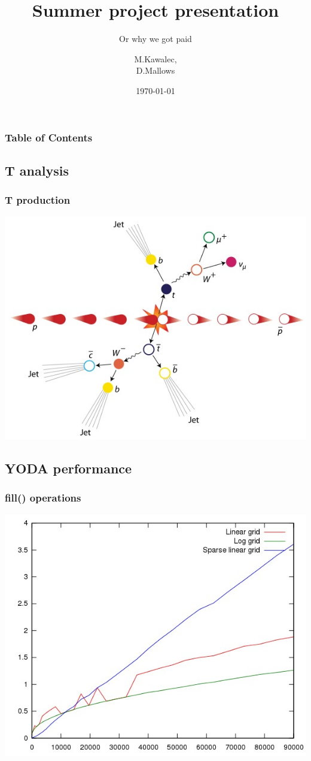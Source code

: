 \documentclass{beamer}
\title{Summer project presentation}
\subtitle{Or why we got paid}
\author{M.Kawalec, \\ D.Mallows}
\date{\today}
\begin{document}
  \frame{\titlepage}

  \begin{frame}
    \frametitle{Table of Contents}
    \tableofcontents
  \end{frame}

  \begin{frame}
    \section{T analysis}
    \frametitle{T production}
    \includegraphics[height=0.89\textheight]{ttbar.jpg}
  \end{frame}
  \begin{frame}
    \section{YODA performance}
      \frametitle{fill() operations}
      \includegraphics[height=0.89\textheight]{1.jpg}
  \end{frame}
\end{document}
